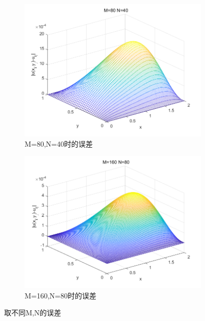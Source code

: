 \documentclass[withoutpreface,bwprint]{cumcmthesis} %
\begin{document}
\begin{figure}
\begin{subfigure}[b]{0.475\textwidth}
			\centering 
			\includegraphics[width=\textwidth]{figures/f3}
			\caption[]%
			{{\small M=80,N=40时的误差}}    
			\label{fig:mean and std of net34}
		\end{subfigure}
		\quad
		\begin{subfigure}[b]{0.475\textwidth}   
			\centering 
			\includegraphics[width=\textwidth]{figures/f4}
			\caption[]%
			{{\small M=160,N=80时的误差}}    
			\label{fig:mean and std of net44}
		\end{subfigure}
		\caption[ The average and standard deviation of critical parameters ]
		{ 取不同M,N的误差} 
		\label{fig:2}
	\end{figure}
\end{document}
